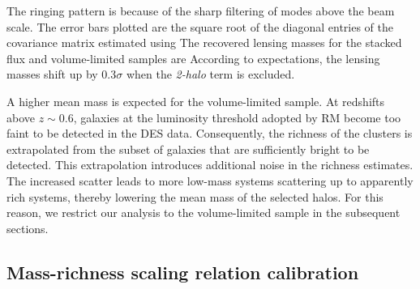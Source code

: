 The ringing pattern is because of the sharp filtering of modes above the \sptpol{} beam scale. 
The error bars plotted are the square root of the diagonal entries of the covariance matrix estimated using %
The recovered lensing masses for the stacked flux and volume-limited samples are %
According to expectations, the lensing masses shift up by 0.3$\sigma$ when the {\it 2-halo} term is excluded.


A higher mean mass is expected for the volume-limited sample. 
At redshifts above $z\sim 0.6$, galaxies at the luminosity threshold adopted by RM become too faint to be detected in the DES data. 
Consequently, the richness of the clusters is extrapolated from the subset of galaxies that are sufficiently bright to be detected. 
This extrapolation introduces additional noise in the richness estimates.
The increased scatter leads to more low-mass systems scattering up to apparently rich systems, thereby lowering the mean mass of the selected halos. 
For this reason, we restrict our analysis to the volume-limited sample in the subsequent sections. 
\subsection{Mass-richness \ML{} scaling relation calibration}\label{sec_ML_scaling}

